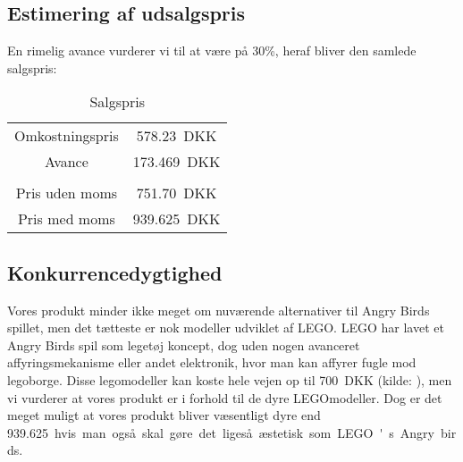 \subsection{Estimering af udsalgspris}
En rimelig avance vurderer vi til at være på 30\%, heraf bliver den samlede salgspris:
\begin{table}[H] \label{tab:salg}
	\caption{Salgspris} %
	\centering
		\begin{tabular}{c c} 
		\hline\hline
			Omkostningspris & \SI{578.23}{DKK}\\ 
			Avance & \SI{173.469}{DKK}\\
			\hline \\
			Pris uden moms & \SI{751.70}{DKK} \\
			Pris med moms & \SI{939.625}{DKK} \\[1ex] %
		\hline %
	\end{tabular}
\end{table}
\subsection{Konkurrencedygtighed}
Vores produkt minder ikke meget om nuværende alternativer til Angry Birds spillet, men det tætteste er nok modeller udviklet af LEGO.
LEGO har lavet et Angry Birds spil som legetøj koncept, dog uden nogen avanceret affyringsmekanisme eller andet elektronik, hvor man kan affyrer fugle mod legoborge. Disse legomodeller kan koste hele vejen op til \SI{700}{DKK} (kilde: \cite{price:legoBird}), men vi vurderer at vores produkt er i forhold til de dyre LEGOmodeller. Dog er det meget muligt at vores produkt bliver væsentligt dyre end \SI{939.625} hvis man også skal gøre det ligeså æstetisk som LEGO's Angry birds.
